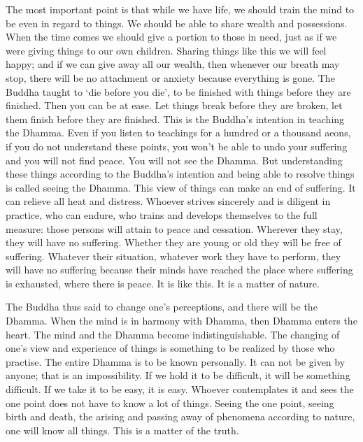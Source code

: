 The most important point is that while we have life, we should train the mind to be even in regard to things. We should be able to share wealth and possessions. When the time comes we should give a portion to those in need, just as if we were giving things to our own children. Sharing things like this we will feel happy; and if we can give away all our wealth, then whenever our breath may stop, there will be no attachment or anxiety because everything is gone. The Buddha taught to `die before you die', to be finished with things before they are finished. Then you can be at ease. Let things break before they are broken, let them finish before they are finished. This is the Buddha's intention in teaching the Dhamma. Even if you listen to teachings for a hundred or a thousand aeons, if you do not understand these points, you won't be able to undo your suffering and you will not find peace. You will not see the Dhamma. But understanding these things according to the Buddha's intention and being able to resolve things is called seeing the Dhamma. This view of things can make an end of suffering. It can relieve all heat and distress. Whoever strives sincerely and is diligent in practice, who can endure, who trains and develops themselves to the full measure: those persons will attain to peace and cessation. Wherever they stay, they will have no suffering. Whether they are young or old they will be free of suffering. Whatever their situation, whatever work they have to perform, they will have no suffering because their minds have reached the place where suffering is exhausted, where there is peace. It is like this. It is a matter of nature.

The Buddha thus said to change one's perceptions, and there will be the Dhamma. When the mind is in harmony with Dhamma, then Dhamma enters the heart. The mind and the Dhamma become indistinguishable. The changing of one's view and experience of things is something to be realized by those who practise. The entire Dhamma is  to be known personally. It can not be given by anyone; that is an impossibility. If we hold it to be difficult, it will be something difficult. If we take it to be easy, it is easy. Whoever contemplates it and sees the one point does not have to know a lot of things. Seeing the one point, seeing birth and death, the arising and passing away of phenomena according to nature, one will know all things. This is a matter of the truth.

